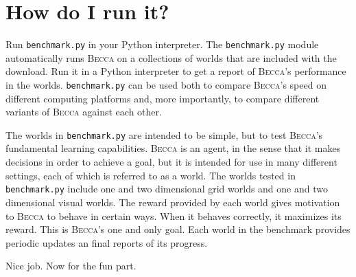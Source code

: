 \section{How do I run it?}

Run \texttt{benchmark.py} in your Python interpreter. The \texttt{benchmark.py} module automatically runs \textsc{Becca} on a collections of worlds that are included with the download. Run it in a Python interpreter to get a report of \textsc{Becca}'s performance in the worlds. \texttt{benchmark.py} can be used both to compare \textsc{Becca}'s speed on different computing platforms and, more importantly, to compare different variants of \textsc{Becca} against each other.

The worlds in \texttt{benchmark.py} are intended to be simple, but to test \textsc{Becca}'s fundamental learning capabilities. \textsc{Becca} is an agent, in the sense that it makes decisions in order to achieve a goal, but it is intended for use in many different settings, each of which is referred to as a world. The worlds tested in \texttt{benchmark.py} include one and two dimensional grid worlds and one and two dimensional visual worlds. The reward provided by each world gives motivation to \textsc{Becca} to behave in certain ways. When it behaves correctly, it maximizes its reward. This is \textsc{Becca}'s one and only goal. Each world in the benchmark provides periodic updates an final reports of its progress. 

Nice job. Now for the fun part.